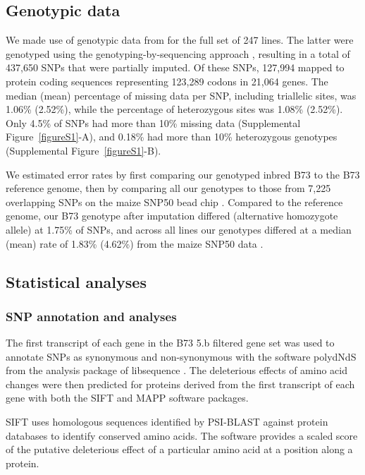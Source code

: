 \documentclass[12pt]{article}
\begin{document}
\subsection*{Genotypic data}

We made use of genotypic data from \citet{Larsson2013} for the full set of 247 lines. The latter were genotyped using the genotyping-by-sequencing approach \citep[GBS;][]{Elshire2011}, resulting in a total of 437,650 SNPs that were partially imputed. Of these SNPs, 127,994 mapped to protein coding sequences representing 123,289 codons in 21,064 genes. The median (mean) percentage of missing data per SNP, including triallelic sites, was 1.06\% (2.52\%), while the percentage of heterozygous sites was 1.08\% (2.52\%). Only 4.5\% of SNPs had more than 10\% missing data (Supplemental Figure~\ref{figureS1}-A), and 0.18\% had more than 10\% heterozygous genotypes (Supplemental Figure~\ref{figureS1}-B).

We estimated error rates by first comparing our genotyped inbred B73 to the B73 reference genome, then by comparing all our genotypes to those from 7,225 overlapping SNPs on the maize SNP50 bead chip \citep{Cook2012}.  
Compared to the reference genome, our B73 genotype after imputation differed (alternative homozygote allele) at 1.75\% of SNPs, and across all lines our genotypes differed at a median (mean) rate of 1.83\% (4.62\%) from the maize SNP50 data \citep{Cook2012}.   

\subsection*{Statistical analyses}

\subsubsection*{SNP annotation and analyses}
 The first transcript of each gene in the B73 5.b filtered gene set was used to annotate SNPs as synonymous and non-synonymous with the software polydNdS from the analysis package of libsequence  \citep{Thornton2003}. The deleterious effects of amino acid changes were then predicted for proteins derived from the first transcript of each gene with both the SIFT \citep{Ng2003, Ng2006} and MAPP \citep{Stone2005} software packages.

SIFT uses homologous sequences identified by PSI-BLAST against protein databases to identify conserved amino acids.  
The software provides a scaled score of the putative deleterious effect of a particular amino acid at a position along a protein. 
\end{document}
